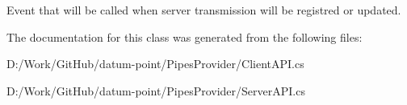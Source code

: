 Event that will be called when server transmission will be registred or updated. 



The documentation for this class was generated from the following files\+:\begin{DoxyCompactItemize}
\item 
D\+:/\+Work/\+Git\+Hub/datum-\/point/\+Pipes\+Provider/Client\+A\+P\+I.\+cs\item 
D\+:/\+Work/\+Git\+Hub/datum-\/point/\+Pipes\+Provider/Server\+A\+P\+I.\+cs\end{DoxyCompactItemize}
